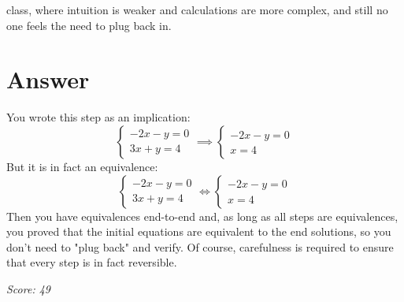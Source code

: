 \documentclass{article}
\begin{document}
class, where intuition is weaker and calculations are more complex, and still no one feels the need to plug back in.

\section*{Answer}
You wrote this step as an implication: $$\begin{cases} -2x-y=0 \\ 3x+y=4 \end{cases} \implies \begin{cases} -2x-y=0\\ x=4 \end{cases}$$ But it is in fact an equivalence: $$\begin{cases} -2x-y=0 \\ 3x+y=4 \end{cases} \iff \begin{cases} -2x-y=0\\ x=4 \end{cases}$$ Then you have equivalences end-to-end and, as long as all steps are equivalences, you proved that the initial equations are equivalent to the end solutions, so you don't need to "plug back" and verify. Of course, carefulness is required to ensure that every step is in fact reversible.

\vspace{1em}
\noindent\textit{Score: 49}
\end{document}
